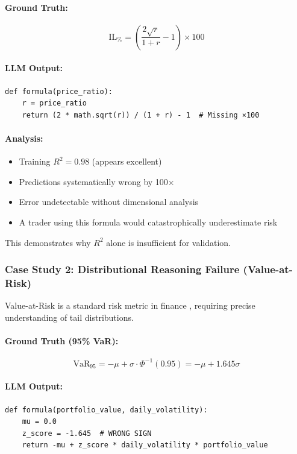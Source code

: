 \documentclass[twoside,11pt]{article}
\begin{document}
\paragraph{Ground Truth:}
\begin{equation}
\text{IL}_{\%} = \left(\frac{2\sqrt{r}}{1+r} - 1\right) \times 100
\end{equation}

\paragraph{LLM Output:}
\begin{verbatim}
def formula(price_ratio):
    r = price_ratio
    return (2 * math.sqrt(r)) / (1 + r) - 1  # Missing ×100
\end{verbatim}

\paragraph{Analysis:} 
\begin{itemize}
\item Training $R^2 = 0.98$ (appears excellent)
\item Predictions systematically wrong by 100$\times$ 
\item Error undetectable without dimensional analysis
\item A trader using this formula would catastrophically underestimate risk
\end{itemize}

This demonstrates why $R^2$ alone is insufficient for validation.

\subsubsection{Case Study 2: Distributional Reasoning Failure (Value-at-Risk)}

Value-at-Risk is a standard risk metric in finance \citep{rockafellar2000optimization,danielsson2017forecasting}, requiring precise understanding of tail distributions.

\paragraph{Ground Truth (95\% VaR):}
\begin{equation}
\text{VaR}_{95} = -\mu + \sigma \cdot \Phi^{-1}(0.95) = -\mu + 1.645\sigma
\end{equation}

\paragraph{LLM Output:}
\begin{verbatim}
def formula(portfolio_value, daily_volatility):
    mu = 0.0
    z_score = -1.645  # WRONG SIGN
    return -mu + z_score * daily_volatility * portfolio_value
\end{verbatim}
\end{document}
